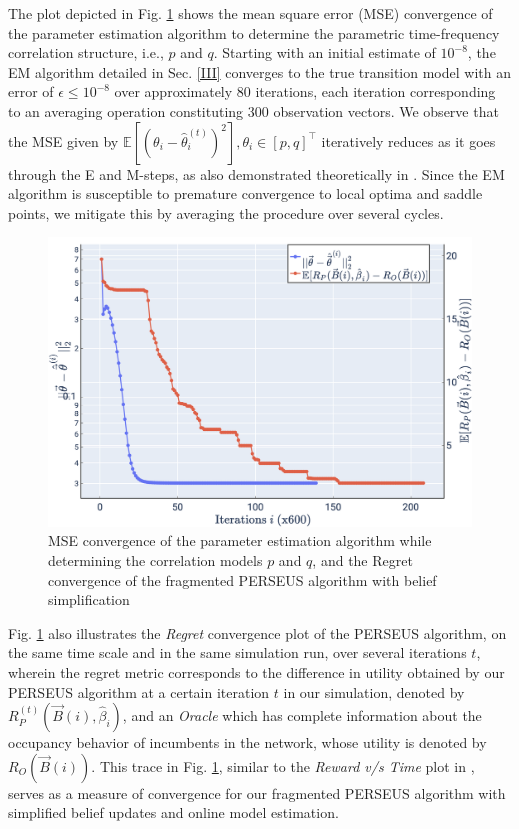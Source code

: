 \documentclass[10pt,twocolumn]{IEEEtran}
\begin{document}
The plot depicted in Fig. \ref{fig:4} shows the mean square error (MSE) convergence of the parameter estimation algorithm to determine the parametric time-frequency correlation structure, i.e., $p$ and $q$. Starting with an initial estimate of $10^{-8}$, the EM algorithm detailed in Sec. \ref{III} converges to the true transition model with an error of $\epsilon{\leq}10^{-8}$ over approximately 80 iterations, each iteration corresponding to an averaging operation constituting 300 observation vectors. We observe that the MSE given by $\mathbb{E}[(\theta_{i}{-}\hat{\theta}_{i}^{(t)})^{2}],\theta_{i}{\in}[p,q]^{\intercal}$ iteratively reduces as it goes through the E and M-steps, as also demonstrated theoretically in  \cite{Neal1998}. Since the EM algorithm is susceptible to premature convergence to local optima and saddle points, we mitigate this by averaging the procedure over several cycles.
\begin{figure}
    \centering
    \includegraphics[width=0.80\linewidth]{PerseusRegretConvergence_MeanSquareErrorConvergence.png}
    \caption{MSE convergence of the parameter estimation algorithm while determining the correlation models $p$ and $q$, and the Regret convergence of the fragmented PERSEUS algorithm with belief simplification}
    \vspace{-4mm}
    \label{fig:4}
\end{figure}
Fig. \ref{fig:4} also illustrates the \emph{Regret} convergence plot of the PERSEUS algorithm, on the same time scale and in the same simulation run, over several iterations $t$, wherein the regret metric corresponds to the difference in utility obtained by our PERSEUS algorithm at a certain iteration $t$ in our simulation, denoted by $R_{P}^{(t)}(\vec{B}(i), \hat{\beta}_{i})$, and an \emph{Oracle} which has complete information about the occupancy behavior of incumbents in the network, whose utility is denoted by $R_{O}(\vec{B}(i))$. This trace in Fig. \ref{fig:4}, similar to the \emph{Reward v/s Time} plot in \cite{DBLP:journals/corr/abs-1109-2145}, serves as a measure of convergence for our fragmented PERSEUS algorithm with simplified belief updates and online model estimation.
\end{document}
